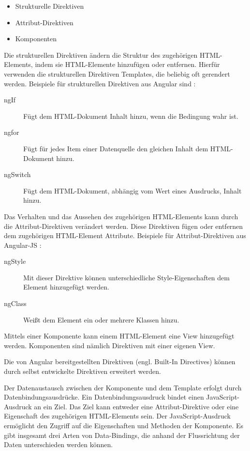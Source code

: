 \begin{itemize}
	\item Strukturelle Direktiven 
	\item Attribut-Direktiven
	\item Komponenten
\end{itemize}

Die strukturellen Direktiven ändern die Struktur des zugehörigen HTML-Elements, indem sie HTML-Elemente hinzufügen oder entfernen. Hierfür verwenden die strukturellen Direktiven Templates, die beliebig oft gerendert werden. \autocites[vgl.][269\psqq]{Steyer.2017}[vgl.][365]{Freeman.2018} Beispiele für strukturellen Direktiven aus Angular sind \autocite[vgl.][261\psqq]{Freeman.2018}:
\begin{description}
	\item [ngIf] Fügt dem HTML-Dokument Inhalt hinzu, wenn die Bedingung wahr ist. 
	\item [ngfor] Fügt für jedes Item einer Datenquelle den gleichen Inhalt dem HTML-Dokument hinzu.
	\item [ngSwitch] Fügt dem HTML-Dokument, abhängig vom Wert eines Ausdrucks, Inhalt hinzu.
\end{description} 

Das Verhalten und das Aussehen des zugehörigen HTML-Elements kann durch die Attribut-Direktiven verändert werden. Diese Direktiven fügen oder entfernen dem zugehörigen HTML-Element Attribute. \autocite[vgl.][339]{Freeman.2018} Beispiele für Attribut-Direktiven aus Angular-JS \autocite[vgl.][249\psqq]{Freeman.2018}:
\begin{description}
	\item [ngStyle] Mit dieser Direktive können unterschiedliche Style-Eigenschaften dem Element hinzugefügt werden.
	\item [ngClass] Weißt dem Element ein oder mehrere Klassen hinzu. 
\end{description}

Mittels einer Komponente kann einem HTML-Element eine View hinzugefügt werden. Komponenten sind nämlich Direktiven mit einer eigenen View. \autocites[vgl.][265]{Steyer.2017}

Die von Angular bereitgestellten Direktiven (engl. Built-In Directives) können durch selbst entwickelte Direktiven erweitert werden. \autocite[vgl.][261]{Freeman.2018}

Der Datenaustausch zwischen der Komponente und dem Template erfolgt durch Datenbindungsausdrücke. Ein Datenbindungsausdruck bindet einen JavaScript-Ausdruck an ein Ziel. Das Ziel kann entweder eine Attribut-Direktive oder eine Eigenschaft des zugehörigen HTML-Elements sein. Der JavaScript-Ausdruck ermöglicht den Zugriff auf die Eigenschaften und Methoden der Komponente. \autocites[vgl.][237\psqq]{Freeman.2018}[vgl.][52\psq]{Steyer.2017} [vgl.][]{Google.d} Es gibt insgesamt drei Arten von Data-Bindings, die anhand der Flussrichtung der Daten unterschieden werden können. 

